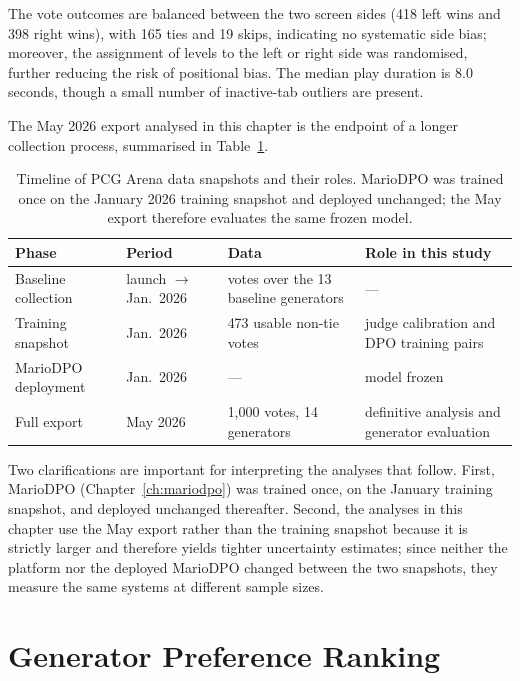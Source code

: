 \documentclass[shortabstract, mgr, english]{iithesis}
\begin{document}
The vote outcomes are balanced between the two screen sides (418 left wins and 398 right wins), with 165 ties and 19 skips, indicating no systematic side bias; moreover, the assignment of levels to the left or right side was randomised, further reducing the risk of positional bias. The median play duration is 8.0 seconds, though a small number of inactive-tab outliers are present.

The May 2026 export analysed in this chapter is the endpoint of a
longer collection process, summarised in Table~\ref{tab:eda-timeline}.

\begin{table}[H]
\centering
\footnotesize
\begin{tabular}{@{} l l p{2.4cm} p{4.2cm} @{}}
\toprule
\textbf{Phase} & \textbf{Period} & \textbf{Data} & \textbf{Role in this study} \\
\midrule
Baseline collection & launch $\to$ Jan.\ 2026 & votes over the 13 baseline generators & --- \\
Training snapshot & Jan.\ 2026 & 473 usable non-tie votes & judge calibration and DPO training pairs \\
MarioDPO deployment & Jan.\ 2026 & --- & model frozen \\
Full export & May 2026 & 1,000 votes, 14 generators & definitive analysis and generator evaluation \\
\bottomrule
\end{tabular}
\caption{Timeline of PCG Arena data snapshots and their roles.
MarioDPO was trained once on the January 2026 training snapshot and deployed
unchanged; the May export therefore evaluates the same frozen model.}
\label{tab:eda-timeline}
\end{table}

Two clarifications are important for interpreting the analyses that
follow. First, MarioDPO (Chapter~\ref{ch:mariodpo}) was trained once, on the
January training snapshot, and deployed unchanged thereafter. Second, the
analyses in this chapter use the May export rather than the training snapshot
because it is strictly larger and therefore yields tighter uncertainty
estimates; since neither the platform nor the deployed MarioDPO changed
between the two snapshots, they measure the same systems at different sample
sizes.

\section{Generator Preference Ranking}
\label{sec:eda-rankings}
\end{document}
